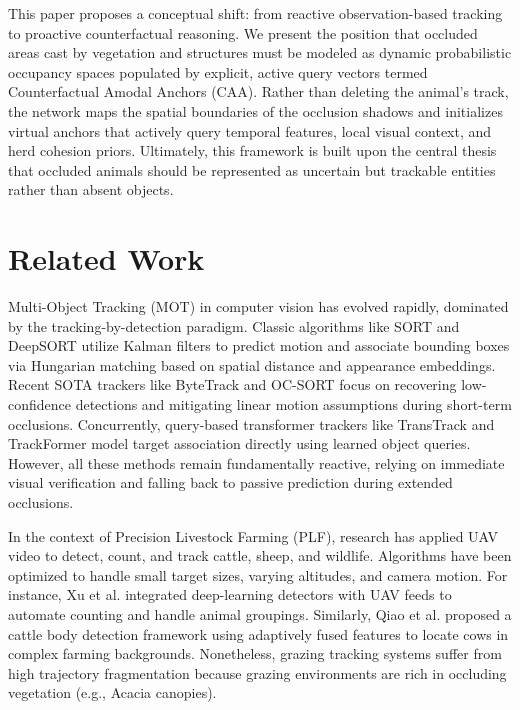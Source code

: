 \documentclass[10pt,conference,letterpaper,twocolumn]{article}
\begin{document}
This paper proposes a conceptual shift: from reactive observation-based tracking to proactive counterfactual reasoning. We present the position that occluded areas cast by vegetation and structures must be modeled as dynamic probabilistic occupancy spaces populated by explicit, active query vectors termed Counterfactual Amodal Anchors (CAA). Rather than deleting the animal's track, the network maps the spatial boundaries of the occlusion shadows and initializes virtual anchors that actively query temporal features, local visual context, and herd cohesion priors. Ultimately, this framework is built upon the central thesis that occluded animals should be represented as uncertain but trackable entities rather than absent objects.

\section{Related Work}
Multi-Object Tracking (MOT) in computer vision has evolved rapidly, dominated by the tracking-by-detection paradigm. Classic algorithms like SORT \cite{bewley2016simple} and DeepSORT \cite{wojke2017deepsort} utilize Kalman filters to predict motion and associate bounding boxes via Hungarian matching based on spatial distance and appearance embeddings. Recent SOTA trackers like ByteTrack \cite{zhang2022bytetrack} and OC-SORT \cite{cao2023ocsort} focus on recovering low-confidence detections and mitigating linear motion assumptions during short-term occlusions. Concurrently, query-based transformer trackers like TransTrack \cite{sun2020transtrack} and TrackFormer model target association directly using learned object queries. However, all these methods remain fundamentally reactive, relying on immediate visual verification and falling back to passive prediction during extended occlusions.

In the context of Precision Livestock Farming (PLF), research has applied UAV video to detect, count, and track cattle, sheep, and wildlife. Algorithms have been optimized to handle small target sizes, varying altitudes, and camera motion. For instance, Xu et al. \cite{xu2020automated} integrated deep-learning detectors with UAV feeds to automate counting and handle animal groupings. Similarly, Qiao et al. \cite{qiao2023cattle} proposed a cattle body detection framework using adaptively fused features to locate cows in complex farming backgrounds. Nonetheless, grazing tracking systems suffer from high trajectory fragmentation because grazing environments are rich in occluding vegetation (e.g., Acacia canopies). 
\end{document}
